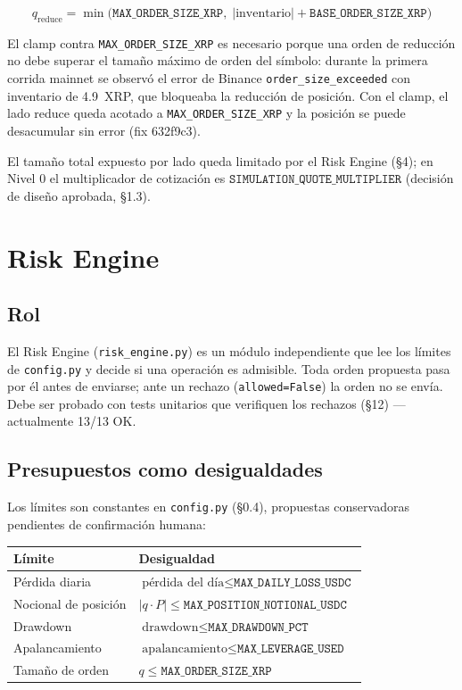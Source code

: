 \documentclass[11pt,a4paper]{article}
\newcommand{\codigo}[1]{\texttt{#1}}
\begin{document}
\begin{equation}
  q_{\mathrm{reduce}}
  = \min\!\bigl(\codigo{MAX\_ORDER\_SIZE\_XRP},\;
    |\text{inventario}| + \codigo{BASE\_ORDER\_SIZE\_XRP}\bigr)
\end{equation}

El clamp contra \codigo{MAX\_ORDER\_SIZE\_XRP} es necesario porque una
orden de reducción no debe superar el tamaño máximo de orden del
símbolo: durante la primera corrida mainnet se observó el error de
Binance \codigo{order\_size\_exceeded} con inventario de 4.9~XRP, que
bloqueaba la reducción de posición. Con el clamp, el lado reduce queda
acotado a \codigo{MAX\_ORDER\_SIZE\_XRP} y la posición se puede
desacumular sin error (fix 632f9c3).

El tamaño total expuesto por lado queda limitado por el Risk Engine
(§4); en Nivel 0 el multiplicador de cotización es
$\codigo{SIMULATION\_QUOTE\_MULTIPLIER}$ (decisión de diseño aprobada,
§1.3).

\section{Risk Engine}

\subsection{Rol}
El Risk Engine (\codigo{risk\_engine.py}) es un módulo independiente que
lee los límites de \codigo{config.py} y decide si una operación es
admisible. Toda orden propuesta pasa por él antes de enviarse; ante un
rechazo (\codigo{allowed=False}) la orden no se envía. Debe ser probado
con tests unitarios que verifiquen los rechazos (§12) — actualmente
13/13 OK.

\subsection{Presupuestos como desigualdades}
Los límites son constantes en \codigo{config.py} (§0.4), propuestas
conservadoras pendientes de confirmación humana:

\begin{center}
\begin{tabular}{ll}
\toprule
\textbf{Límite} & \textbf{Desigualdad} \\
\midrule
Pérdida diaria & $\text{pérdida del día} \leq \codigo{MAX\_DAILY\_LOSS\_USDC}$ \\
Nocional de posición & $|q\cdot P| \leq \codigo{MAX\_POSITION\_NOTIONAL\_USDC}$ \\
Drawdown & $\text{drawdown} \leq \codigo{MAX\_DRAWDOWN\_PCT}$ \\
Apalancamiento & $\text{apalancamiento} \leq \codigo{MAX\_LEVERAGE\_USED}$ \\
Tamaño de orden & $q \leq \codigo{MAX\_ORDER\_SIZE\_XRP}$ \\
\bottomrule
\end{tabular}
\end{center}
\end{document}

